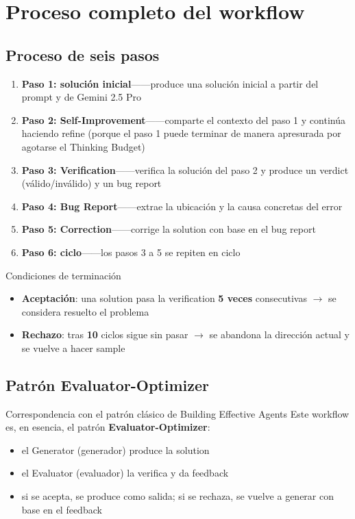 \section{Proceso completo del workflow}

\subsection{Proceso de seis pasos}

\begin{enumerate}
    \item \textbf{Paso 1: solución inicial}——produce una solución inicial a partir del prompt y de Gemini 2.5 Pro
    \item \textbf{Paso 2: Self-Improvement}——comparte el contexto del paso 1 y continúa haciendo refine (porque el paso 1 puede terminar de manera apresurada por agotarse el Thinking Budget)
    \item \textbf{Paso 3: Verification}——verifica la solución del paso 2 y produce un verdict (válido/inválido) y un bug report
    \item \textbf{Paso 4: Bug Report}——extrae la ubicación y la causa concretas del error
    \item \textbf{Paso 5: Correction}——corrige la solution con base en el bug report
    \item \textbf{Paso 6: ciclo}——los pasos 3 a 5 se repiten en ciclo
\end{enumerate}

\begin{importantbox}{Condiciones de terminación}
\begin{itemize}
    \item \textbf{Aceptación}: una solution pasa la verification \textbf{5 veces} consecutivas $\rightarrow$ se considera resuelto el problema
    \item \textbf{Rechazo}: tras \textbf{10} ciclos sigue sin pasar $\rightarrow$ se abandona la dirección actual y se vuelve a hacer sample
\end{itemize}
\end{importantbox}

\subsection{Patrón Evaluator-Optimizer}

\begin{knowledgebox}{Correspondencia con el patrón clásico de Building Effective Agents}
Este workflow es, en esencia, el patrón \textbf{Evaluator-Optimizer}:
\begin{itemize}
    \item el Generator (generador) produce la solution
    \item el Evaluator (evaluador) la verifica y da feedback
    \item si se acepta, se produce como salida; si se rechaza, se vuelve a generar con base en el feedback
\end{itemize}
\end{knowledgebox}

